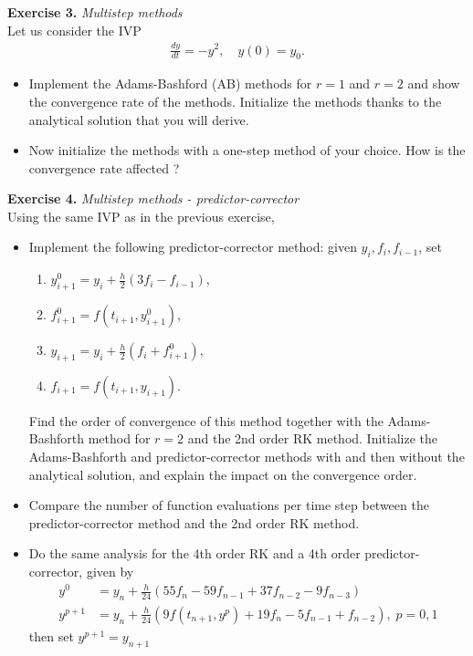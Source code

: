 \documentclass{article}
\begin{document}
\vspace{0.5cm}
\noindent \textbf{Exercise 3.} \textit{Multistep methods} \\
Let us consider the IVP
\begin{align*}
    \frac{dy}{dt} = -y^2, \quad y(0) = y_0.
\end{align*}
\begin{itemize}
    \item Implement the Adams-Bashford (AB) methods for $r=1$ and $r=2$ and show the convergence rate of the methods. Initialize the methods thanks to the analytical solution that you will derive.
    \item Now initialize the methods with a one-step method of your choice. How is the convergence rate affected ?
 \end{itemize}
 \vspace{0.5cm}
\noindent \textbf{Exercise 4.} \textit{Multistep methods - predictor-corrector} \\
Using the same IVP as in the previous exercise,
\begin{itemize}
    \item Implement the following predictor-corrector method: given $y_i, f_i, f_{i-1}$, set
\begin{enumerate}
    \item $y_{i+1}^0=y_i+\frac{h}{2}\left(3 f_i-f_{i-1}\right)$,
    \item $f_{i+1}^0=f\left(t_{i+1}, y_{i+1}^0\right)$,
    \item $y_{i+1}=y_i+\frac{h}{2}\left(f_i+f_{i+1}^0\right)$,
    \item $f_{i+1}=f\left(t_{i+1}, y_{i+1}\right)$.
\end{enumerate}
Find the order of convergence of this method together with the Adams-Bashforth method for $r=2$ and the 2nd order RK method. Initialize the Adams-Bashforth and predictor-corrector methods with and then without the analytical solution, and explain the impact on the convergence order.
\item Compare the number of function evaluations per time step between the predictor-corrector method and the 2nd order RK method.
\item Do the same analysis for the 4th order RK and a 4th order predictor-corrector, given by
\begin{align*} 
y^{0}&=y_{n}+\frac{h}{24}\left( 55f_{n}-59f_{n-1}+37f_{n-2}-9f_{n-3}\right) \\
y^{p+1}&=y_{n}+\frac{h}{24}\left( 9f\left( t_{n+1},y^{p}\right)
+19f_{n}-5f_{n-1}+f_{n-2}\right) , \;p=0,1 \end{align*}
then set $y^{p+1} = y_{n+1}$
\end{itemize}
\end{document}
